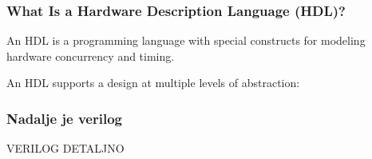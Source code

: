 \documentclass{beamer}
\begin{document}
\begin{frame}
\frametitle{What Is a Hardware Description Language (HDL)?}

An HDL is a programming language with special constructs for modeling hardware concurrency and timing.

An HDL supports a design at multiple levels of abstraction:


\end{frame}


\begin{frame}
\frametitle{Nadalje je verilog}

VERILOG DETALJNO


\end{frame}
\end{document}
